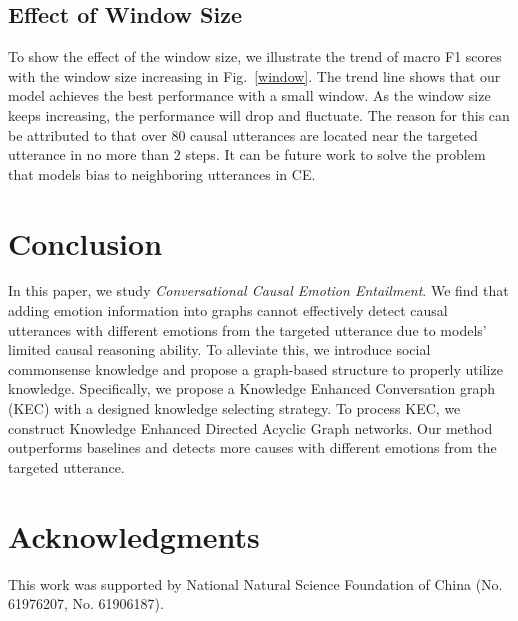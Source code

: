 \documentclass{article}
\begin{document}
\subsection{Effect of Window Size}

To show the effect of the window size, we illustrate the trend of macro F1 scores with the window size increasing in Fig.~\ref{window}. The trend line shows that our model achieves the best performance with a small window. As the window size keeps increasing, the performance will drop and fluctuate. The reason for this can be attributed to that over 80 causal utterances are located near the targeted utterance in no more than 2 steps. It can be future work to solve the problem that models bias to neighboring utterances in CE. 

\section{Conclusion}

In this paper, we study \textit{Conversational Causal Emotion Entailment}. We find that adding emotion information into graphs cannot effectively detect causal utterances with different emotions from the targeted utterance due to models' limited causal reasoning ability. To alleviate this, we introduce social commonsense knowledge and propose a graph-based structure to properly utilize knowledge. Specifically, we propose a Knowledge Enhanced Conversation graph (KEC) with a designed knowledge selecting strategy. To process KEC, we construct Knowledge Enhanced Directed Acyclic Graph networks. Our method outperforms baselines and detects more causes with different emotions from the targeted utterance.  

\section*{Acknowledgments}

This work was supported by National Natural Science Foundation of China (No. 61976207, No. 61906187). 



















\end{document}
